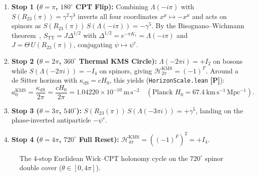 \documentclass[11pt,a4paper]{article}
\newcommand{\badgeP}{\textbf{\color{sqJade}[P]}}
\theoremstyle{definition}
\begin{document}
\begin{enumerate}
  \item \textbf{Stop 1 ($\theta = \pi$, $180^\circ$ CPT Flip):} Combining $\Lambda(-i\pi)$ with $S(R_{23}(\pi)) = \gamma^2\gamma^3$ inverts all four coordinates $x^\mu \mapsto -x^\mu$ and acts on spinors as $S(R_{23}(\pi))\,S(\Lambda(-i\pi)) = -\gamma^5$. By the Bisognano--Wichmann theorem~\cite{BisognanoWichmann1975}, $S_{\mathrm{TT}} = J\Delta^{1/2}$ with $\Delta^{1/2} = e^{-\pi K_1} = \Lambda(-i\pi)$ and $J = \Theta\,U(R_{23}(\pi))$, conjugating $\psi \mapsto \psi^c$.
  \item \textbf{Stop 2 ($\theta = 2\pi$, $360^\circ$ Thermal KMS Circle):} $\Lambda(-2\pi i) = +I_2$ on bosons while $S(\Lambda(-2\pi i)) = -I_4$ on spinors, giving $\mathcal{H}_{2\pi}^{\mathrm{KMS}} = (-1)^F$. Around a de Sitter horizon with $\kappa_{\mathrm{dS}} = c H_0$, this yields (\texttt{HorizonScale.lean} \badgeP):
  \begin{equation}
    a_0^{\mathrm{KMS}} = \frac{\kappa_{\mathrm{dS}}}{2\pi} = \frac{c H_0}{2\pi} = 1.04220 \times 10^{-10}\ \mathrm{m\,s^{-2}} \quad (\text{Planck } H_0 = 67.4\ \mathrm{km\,s^{-1}\,Mpc^{-1}}).
  \end{equation}
  \item \textbf{Stop 3 ($\theta = 3\pi$, $540^\circ$):} $S(R_{23}(\pi))\,S(\Lambda(-3\pi i)) = +\gamma^5$, landing on the phase-inverted antiparticle $-\psi^c$.
  \item \textbf{Stop 4 ($\theta = 4\pi$, $720^\circ$ Full Reset):} $\mathcal{H}_{4\pi}^{\mathrm{KMS}} = ((-1)^F)^2 = +I_4$.
\end{enumerate}

\begin{figure}[!htbp]
\centering
{}
\caption{The 4-stop Euclidean Wick--CPT holonomy cycle on the $720^\circ$ spinor double cover ($\theta \in [0,4\pi]$).}
\end{figure}
\end{document}

